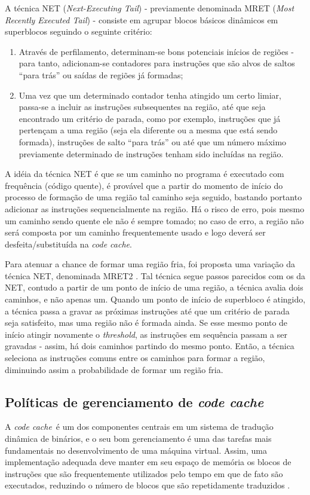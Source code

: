 \documentclass[12pt,twoside]{article}
\newcommand{\ccache}{\emph{code cache}}
\newcommand{\qq}[1]{``#1''}
\begin{document}
A técnica NET (\emph{Next-Executing Tail}) \cite{net-region} - previamente denominada MRET (\emph{Most Recently Executed Tail}) - consiste em agrupar blocos básicos dinâmicos em superblocos seguindo o seguinte critério:
\begin{enumerate}
\item Através de perfilamento, determinam-se bons potenciais inícios de regiões - para tanto, adicionam-se contadores para instruções que são alvos de saltos \qq{para trás} ou saídas de regiões já formadas;


\item Uma vez que um determinado contador tenha atingido um certo limiar, passa-se a incluir as instruções subsequentes na região, até que seja encontrado um critério de parada, como por exemplo, instruções que já pertençam a uma região (seja ela diferente ou a mesma que está sendo formada), instruções de salto \qq{para trás} ou até que um número máximo previamente determinado  de instruções tenham sido incluídas na região.
\end{enumerate}
A idéia da técnica NET é que se um caminho no programa é executado com frequência (código quente), é provável que a partir do momento de início do processo de formação de uma região tal caminho seja seguido, bastando portanto adicionar as instruções sequencialmente na região. Há o risco de erro, pois mesmo um caminho sendo quente ele não é sempre tomado; no caso de erro, a região não será composta por um caminho frequentemente usado e logo deverá ser desfeita/substituída na \ccache.

Para atenuar a chance de formar uma região fria, foi proposta uma variação da técnica NET, denominada MRET2 \cite{mret2-region}. Tal técnica segue passos parecidos com os da NET, contudo a partir de um ponto de início de uma região, a técnica avalia dois caminhos, e não apenas um. Quando um ponto de início de superbloco é atingido, a técnica passa a gravar as próximas instruções até que um critério de parada seja satisfeito, mas uma região não é formada ainda. Se esse mesmo ponto de início atingir novamente o \emph{threshold}, as instruções em sequência passam a ser gravadas - assim, há dois caminhos partindo do mesmo ponto. Então, a técnica seleciona as instruções comuns entre os caminhos para formar a região, diminuindo assim a probabilidade de formar um região fria.


\subsection{Políticas de gerenciamento de \emph{code cache}}
\label{sec-codecache}
A \ccache~é um dos componentes centrais em um sistema de tradução dinâmica de binários, e o seu bom gerenciamento é uma das tarefas mais fundamentais no desenvolvimento de uma máquina virtual. Assim, uma implementação adequada deve manter em seu espaço de memória os blocos de instruções que são frequentemente utilizados pelo tempo em que de fato são executados, reduzindo o número de blocos que são repetidamente traduzidos \cite{kim-2004-a}.
\end{document}
